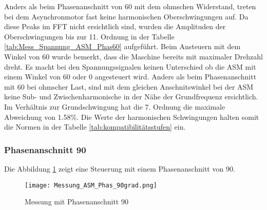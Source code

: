 Anders als beim Phasenanschnitt von 60\textdegree\hspace{0.02cm} mit dem ohmschen Widerstand, treten bei dem Asynchronmotor fast keine harmonischen Oberschwingungen auf. Da diese Peaks im FFT nicht ersichtlich sind, wurden die Amplituden der Oberschwingungen bis zur 11. Ordnung in der Tabelle \ref{tab:Mess_Spannung_ASM_Phas60} aufgeführt. 
Beim Ansteuern mit dem Winkel von 60\textdegree \hspace{0.02cm} wurde bemerkt, dass die Maschine bereits mit maximaler Drehzahl dreht. Es macht bei den Spannungssignalen keinen Unterschied ob die ASM mit einem Winkel von 60\textdegree \hspace{0.02cm} oder 0\textdegree \hspace{0.02cm} angesteuert wird. Anders als beim Phasenanschnitt mit 60\textdegree\hspace{0.02cm} bei ohmscher Last, sind mit dem gleichen Anschnitswinkel bei der ASM keine Sub- und Zwischenharmonische in der Nähe der Grundfrequenz ersichtlich. Im Verhältnis zur Grundschwingung hat die 7. Ordnung die maximale Abweichung von 1.58\%. Die Werte der harmonischen Schwingungen halten somit die Normen in der Tabelle \ref{tab:kompatibilitätsstufen} ein. 

\newpage
\subsubsection*{Phasenanschnitt 90\textdegree}
Die Abbildung \ref{fig:Mess_ASM_Phas90} zeigt eine Steuerung mit einem Phasenanschnitt von 90\textdegree.

\begin{figure}[ht!]
	\centering
	\texttt{[image: Messung\_ASM\_Phas\_90grad.png]}	
	\caption{Messung mit Phasenanschnitt 90\textdegree}\label{fig:Mess_ASM_Phas90}
\end{figure}

\newpage


